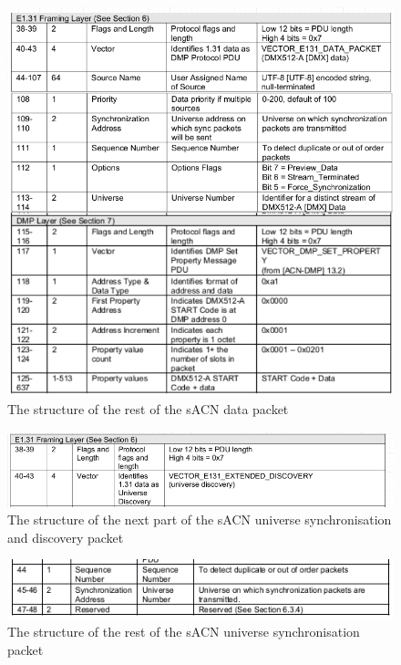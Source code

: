 \documentclass[11pt,a4paper]{report}
\begin{document}
\begin{figure}[H]
\label{ACN_DATA_STRUCTURE}
\includegraphics[width=\textwidth]{acn_data_structure}
\caption{The structure of the rest of the sACN data packet}
\end{figure}

\begin{figure}[H]
\label{ACN_EXTENDED_START}
\includegraphics[width=\textwidth]{Acn_extended_framing_structure_sync_discovery}
\caption{The structure of the next part of the sACN universe synchronisation and discovery packet}
\end{figure}

\begin{figure}[H]
\label{ACN_REST_SYNC_PACKET}
\includegraphics[width=\textwidth]{acn_sync_packet_specific_structure}
\caption{The structure of the rest of the sACN universe synchronisation packet}
\end{figure}
\end{document}
